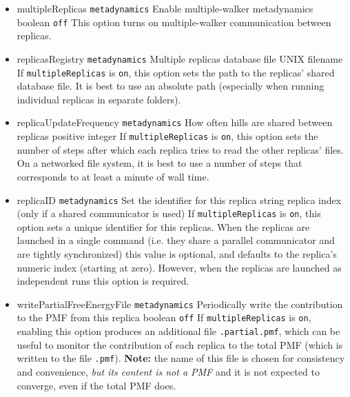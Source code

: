 \begin{itemize}

\item %
  \keydef
    {multipleReplicas}{%
    \texttt{metadynamics}}{%
    Enable multiple-walker metadynamics}{%
    boolean}{%
    \texttt{off}}{%
    This option turns on multiple-walker communication between replicas. }

\item %
  \key
    {replicasRegistry}{%
    \texttt{metadynamics}}{%
    Multiple replicas database file}{%
    UNIX filename}{%
    If \texttt{multipleReplicas} is \texttt{on}, this option sets the path to the replicas' shared database file.
    It is best to use an absolute path (especially when running individual replicas in separate folders).
  }

\item %
  \key
    {replicaUpdateFrequency}{%
    \texttt{metadynamics}}{%
    How often hills are shared between replicas}{%
    positive integer}{%
    If \texttt{multipleReplicas} is \texttt{on}, this option sets the number of steps after which each replica tries to read the other replicas' files.
    On a networked file system, it is best to use a number of steps that corresponds to at least a minute of wall time.
  }

\item %
  \keydef
    {replicaID}{%
    \texttt{metadynamics}}{%
    Set the identifier for this replica}{%
    string}{%
    replica index (only if a shared communicator is used)}{%
    If \texttt{multipleReplicas} is \texttt{on}, this option sets a unique identifier for this replicas.
    When the replicas are launched in a single command (i.e.{} they share a parallel communicator and are tightly synchronized) this value is optional, and defaults to the replica's numeric index (starting at zero).
    However, when the replicas are launched as independent runs this option is required.
}

\item %
  \keydef
    {writePartialFreeEnergyFile}{%
    \texttt{metadynamics}}{%
    Periodically write the contribution to the
    PMF from this replica}{%
    boolean}{%
    \texttt{off}}{%
    If \texttt{multipleReplicas} is \texttt{on}, enabling this option produces  an additional file \outputName\texttt{.partial.pmf}, which can be useful to monitor the contribution of each replica to the total PMF (which is written to the file \outputName\texttt{.pmf}).
    \textbf{Note:} the name of this file is chosen for consistency and convenience, \emph{but its content is not a PMF} and it is not expected to converge, even if the total PMF does.
}

\end{itemize}



